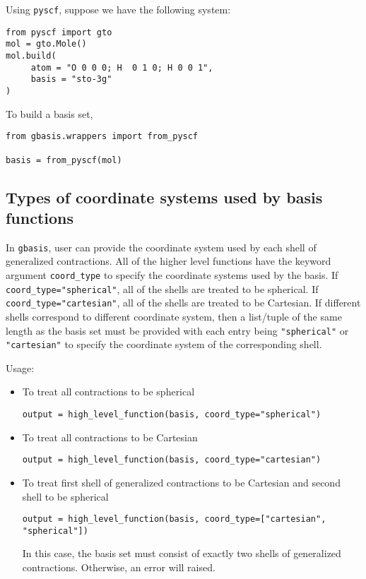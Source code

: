 \documentclass[letterpaper]{article}
\begin{document}
Using \verb|pyscf|, suppose we have the following system:
\begin{verbatim}
from pyscf import gto
mol = gto.Mole()
mol.build(
     atom = "O 0 0 0; H  0 1 0; H 0 0 1",
     basis = "sto-3g"
)
\end{verbatim}
To build a basis set,
\begin{verbatim}
from gbasis.wrappers import from_pyscf

basis = from_pyscf(mol)
\end{verbatim}

\subsection{Types of coordinate systems used by basis functions}
In \verb|gbasis|, user can provide the coordinate system used by each shell of
generalized contractions.
All of the higher level functions have the keyword argument \verb|coord_type| to
specify the coordinate systems used by the basis.
If \verb|coord_type="spherical"|, all of the shells are treated to be spherical.
If \verb|coord_type="cartesian"|, all of the shells are treated to be
Cartesian.
If different shells correspond to different coordinate system, then a list/tuple
of the same length as the basis set must be provided with each entry being
\verb|"spherical"| or \verb|"cartesian"| to specify the coordinate system of the
corresponding shell.

Usage:
\begin{itemize}
\item To treat all contractions to be spherical
\begin{verbatim}
output = high_level_function(basis, coord_type="spherical")
\end{verbatim}
\item To treat all contractions to be Cartesian
\begin{verbatim}
output = high_level_function(basis, coord_type="cartesian")
\end{verbatim}
\item To treat first shell of generalized contractions to be Cartesian and
  second shell to be spherical
\begin{verbatim}
output = high_level_function(basis, coord_type=["cartesian", "spherical"])
\end{verbatim}
  In this case, the basis set must consist of exactly two shells of
  generalized contractions. Otherwise, an error will raised.
\end{itemize}
\end{document}
